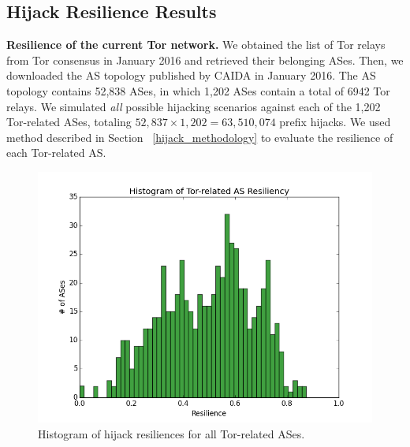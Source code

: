 
\subsection{Hijack Resilience Results}

{\bf Resilience of the current Tor network.} We obtained the list of Tor relays from Tor consensus in January 2016 and retrieved their belonging ASes. Then, we downloaded the AS topology published by CAIDA in January 2016. The AS topology contains 52,838 ASes, in which 1,202 ASes contain a total of 6942 Tor relays. We simulated \emph{all} possible hijacking scenarios against each of the 1,202 Tor-related ASes, totaling $52,837 \times 1,202 = 63,510,074$ prefix hijacks. We used method described in Section ~\ref{hijack_methodology} to evaluate the resilience of each Tor-related AS. 

\begin{figure}[ht!]
\centering
\includegraphics[width=.4\textwidth]{resilience_histogram}
\caption{Histogram of hijack resiliences for all Tor-related ASes.}
\label{fig:hijack_resilience_histogram}
\end{figure}

